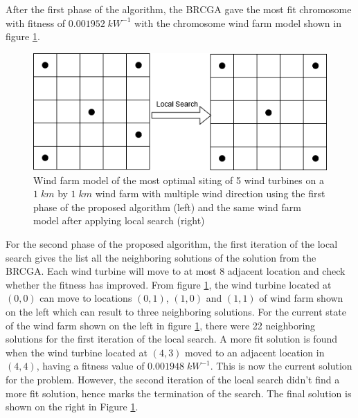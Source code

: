     After the first phase of the algorithm, the BRCGA gave the most fit chromosome with fitness of $0.001952\;kW^{-1}$ with the chromosome wind farm model shown in figure \ref{phase1chromSmall}.
    
    \begin{figure}[h]
        \centering
        \includegraphics[width=\linewidth]{Figures/phase1chromSmall.png}
        \caption{Wind farm model of the most optimal siting of 5 wind turbines on a $1\;km$ by $1\;km$ wind farm with multiple wind direction using the first phase of the proposed algorithm (left) and the same wind farm model after applying local search (right)}
        \label{phase1chromSmall}
    \end{figure}
    
    For the second phase of the proposed algorithm, the first iteration of the local search gives the list all the neighboring solutions of the solution from the BRCGA. Each wind turbine will move to at most 8 adjacent location and check whether the fitness has improved. From figure \ref{phase1chromSmall}, the wind turbine located at $(0,0)$ can move to locations $(0,1)$, $(1,0)$ and $(1,1)$ of wind farm shown on the left which can result to three neighboring solutions. For the current state of the wind farm shown on the left in figure \ref{phase1chromSmall}, there were 22 neighboring solutions for the first iteration of the local search. A more fit solution is found when the wind turbine located at $(4,3)$ moved to an adjacent location in $(4,4)$, having a fitness value of $0.001948\;kW^{-1}$. This is now the current solution for the problem. However, the second iteration of the local search didn't find a more fit solution, hence marks the termination of the search. The final solution is shown on the right in Figure \ref{phase1chromSmall}.